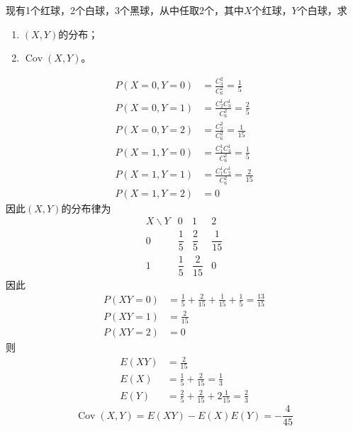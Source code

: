 \begin{example}
    现有1个红球，2个白球，3个黑球，从中任取2个，其中$X$个红球，$Y$个白球，求
    \begin{enumerate}[(1)]
        \item $(X,Y)$的分布；
        \item $\operatorname{Cov}(X,Y)$。
    \end{enumerate}
\end{example}
\begin{solution}
    \begin{align*}
        P(X=0,Y=0) & = \frac{C_3^2}{C_6^2} = \frac{1}{5}       \\
        P(X=0,Y=1) & = \frac{C_2^1C_3^1}{C_6^2} = \frac{2}{5}  \\
        P(X=0,Y=2) & = \frac{C_2^2}{C_6^2} = \frac{1}{15}      \\
        P(X=1,Y=0) & = \frac{C_1^1C_3^1}{C_6^2} = \frac{1}{5}  \\
        P(X=1,Y=1) & = \frac{C_1^1C_2^1}{C_6^2} = \frac{2}{15} \\
        P(X=1,Y=2) & = 0
    \end{align*}
    因此$(X,Y)$的分布律为
    \[
        \begin{array}{c|ccc}
            X\backslash Y & 0            & 1             & 2             \\ \hline
            0             & \dfrac{1}{5} & \dfrac{2}{5}  & \dfrac{1}{15} \\ [2ex]
            1             & \dfrac{1}{5} & \dfrac{2}{15} & 0
        \end{array}
    \]
    因此
    \begin{align*}
        P(XY=0) & = \frac{1}{5}+\frac{2}{15}+\frac{1}{15}+\frac{1}{5}= \frac{13}{15} \\
        P(XY=1) & =\frac{2}{15}                                                      \\
        P(XY=2) & =0
    \end{align*}
    则
    \begin{align*}
        E(XY) & =\frac{2}{15}                                          \\
        E(X)  & =\frac{1}{5}+\frac{2}{15}=\frac{1}{3}                  \\
        E(Y)  & = \frac{2}{5}+\frac{2}{15}+2\frac{1}{15} = \frac{2}{3}
    \end{align*}
    \[ \operatorname{Cov}(X,Y) = E(XY) - E(X)E(Y) = -\frac{4}{45} \]
\end{solution}

